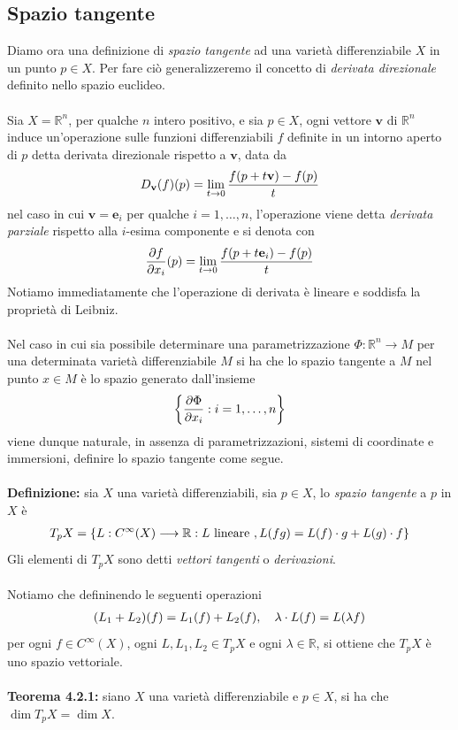 \documentclass{article}
\begin{document}
\subsection{Spazio tangente}
Diamo ora una definizione di \textit{spazio tangente} ad una varietà differenziabile $X$ in un punto $p \in X$. Per fare ciò generalizzeremo il concetto di \textit{derivata direzionale} definito nello spazio euclideo. \\ \\
Sia $X = \mathbb{R}^n$, per qualche $n$ intero positivo, e sia $p \in X$, ogni vettore $\mathbf{v}$ di $\mathbb{R}^n$ induce un'operazione sulle funzioni differenziabili $f$ definite in un intorno aperto di $p$ detta derivata direzionale rispetto a $\mathbf{v}$, data da
\begin{gather}
    D_{\mathbf{v}}(f)(p) = \lim_{t \rightarrow 0} \frac{f(p + t\mathbf{v}) - f(p)}{t} \notag
\end{gather}
nel caso in cui $\mathbf{v} = \mathbf{e}_i$ per qualche $i = 1, \dots, n$, l'operazione viene detta \textit{derivata parziale} rispetto alla $i$-esima componente e si denota con
\begin{gather}
    \frac{\partial f}{\partial x_i}(p) = \lim_{t \rightarrow 0} \frac{f(p + t\mathbf{e}_i) - f(p)}{t} \notag
\end{gather}
Notiamo immediatamente che l'operazione di derivata è lineare e soddisfa la proprietà di Leibniz. \\ \\
Nel caso in cui sia possibile determinare una parametrizzazione $\Phi : \mathbb{R}^n \longrightarrow M$ per una determinata varietà differenziabile $M$ si ha che lo spazio tangente a $M$ nel punto $x \in M$ è lo spazio generato dall'insieme
\begin{gather}
    \left\{ \frac{\partial \Phi}{\partial x_i} : i = 1, \dots, n \right\} \notag
\end{gather}
viene dunque naturale, in assenza di parametrizzazioni, sistemi di coordinate e immersioni, definire lo spazio tangente come segue. \\ \\
\textbf{Definizione:} sia $X$ una varietà differenziabili, sia $p \in X$, lo \textit{spazio tangente} a $p$ in $X$ è
\begin{gather}
    T_pX = \{ L : C^{\infty}(X) \longrightarrow \mathbb{R} : L \text{ lineare }, L(fg) = L(f) \cdot g + L(g) \cdot f \} \notag
\end{gather}
Gli elementi di $T_pX$ sono detti \textit{vettori tangenti} o \textit{derivazioni}. \\ \\
Notiamo che defininendo le seguenti operazioni
\begin{gather}
    (L_1 + L_2)(f) = L_1(f) + L_2(f), \quad \lambda \cdot L(f) = L(\lambda f) \notag
\end{gather}
per ogni $f \in C^{\infty}(X)$, ogni $L, L_1, L_2 \in T_pX$ e ogni $\lambda \in \mathbb{R}$, si ottiene che $T_pX$ è uno spazio vettoriale. \\ \\
\textbf{Teorema 4.2.1:} siano $X$ una varietà differenziabile e $p \in X$, si ha che $\dim T_pX = \dim X$. \\
\end{document}
